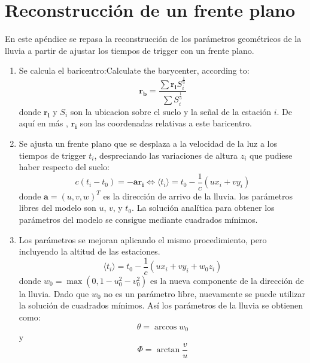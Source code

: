 \chapter{Reconstrucción de un frente plano}
\label{ap:topDown}

En este apéndice se repasa la reconstrucción de los parámetros geométricos de la lluvia a partir de ajustar los tiempos de trigger con un frente plano.

\begin{enumerate}
\item Se calcula el baricentro:Calculate the barycenter, according to:
\begin{equation}
\boldsymbol{r_{b}} =\frac{\sum \boldsymbol{r_{i}}S_{i}^{\frac{1}{3}}}{\sum S_{i}^{\frac{1}{3}}}
\end{equation}
donde $\boldsymbol{r_{i}}$ y $S_{i}$ son la ubicacion sobre el suelo y la señal de la estación $i$.
De aquí en más , $\boldsymbol{r_{i}}$ son las coordenadas relativas a este baricentro.
\item Se ajusta un frente plano que se desplaza a la velocidad de la luz a los tiempos de trigger $t_i$, despreciando las variaciones de altura $z_{i}$ que pudiese haber respecto del suelo:
\begin{equation}
c(t_{i} -t_{0} )=-\boldsymbol{a}\boldsymbol{r_{i}} \Longleftrightarrow \langle t_{i}\rangle = t_{0} - \frac{1}{c}(ux_{i} + vy_{i} )
\end{equation}
donde $\boldsymbol{a} = (u, v, w)^{T}$ es la dirección de arrivo de la lluvia.
los parámetros libres del modelo son $u$, $v$, y $t_{0}$.
La solución analítica para obtener los parámetros del modelo se consigue mediante cuadrados mínimos.

\item Los parámetros se mejoran aplicando el mismo procedimiento, pero incluyendo la altitud de las estaciones. 
\begin{equation}
\langle t_{i}\rangle = t_{0} - \frac{1}{c}(ux_{i} + vy_{i} +w_{0}z_{i})
\end{equation}
donde $w_{0} = \max{(0, 1 - u_{0}^2 - v_{0}^{2} )}$  es la nueva componente de la dirección de la lluvia.
Dado que $w_{0}$ no es un parámetro libre, nuevamente se puede utilizar la solución de cuadrados mínimos.
Así los parámetros de la lluvia se obtienen como:
\begin{equation}
\theta = \arccos w_{0}
\end{equation}
y
\begin{equation}
\Phi = \arctan \frac{v}{u}
\end{equation}




\end{enumerate}
